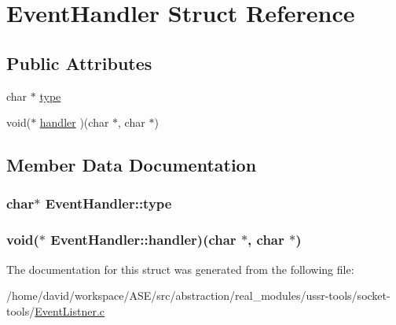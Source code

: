 \hypertarget{structEventHandler}{
\section{EventHandler Struct Reference}
\label{structEventHandler}
}
\subsection*{Public Attributes}
\begin{CompactItemize}
\item 
char $\ast$ \hyperlink{structEventHandler_6247baa79dd43146241fc659e28c4d7a}{type}
\item 
void($\ast$ \hyperlink{structEventHandler_45b763adf4738d94444b1d695b16a9bc}{handler} )(char $\ast$, char $\ast$)
\end{CompactItemize}


\subsection{Member Data Documentation}
\hypertarget{structEventHandler_6247baa79dd43146241fc659e28c4d7a}{
\subsubsection{\setlength{\rightskip}{0pt plus 5cm}char$\ast$ {\bf EventHandler::type}}}
\label{structEventHandler_6247baa79dd43146241fc659e28c4d7a}


\hypertarget{structEventHandler_45b763adf4738d94444b1d695b16a9bc}{
\subsubsection{\setlength{\rightskip}{0pt plus 5cm}void($\ast$ {\bf EventHandler::handler})(char $\ast$, char $\ast$)}}
\label{structEventHandler_45b763adf4738d94444b1d695b16a9bc}




The documentation for this struct was generated from the following file:\begin{CompactItemize}
\item 
/home/david/workspace/ASE/src/abstraction/real\_\-modules/ussr-tools/socket-tools/\hyperlink{EventListner_8c}{EventListner.c}\end{CompactItemize}
